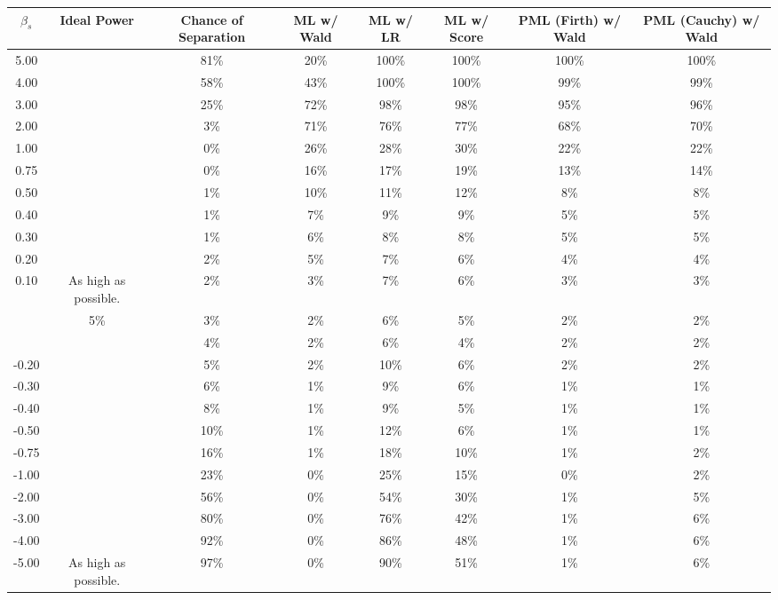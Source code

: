 
\begin{tabular}{>{}cccccccc}
\toprule
$\beta_s$ & Ideal Power & Chance of Separation & ML w/ Wald & ML w/ LR & ML w/ Score & PML (Firth) w/ Wald & PML (Cauchy) w/ Wald\\
\midrule
5.00 &  & 81\% & 20\% & 100\% & 100\% & 100\% & 100\%\\

4.00 &  & 58\% & 43\% & 100\% & 100\% & 99\% & 99\%\\

3.00 &  & 25\% & 72\% & 98\% & 98\% & 95\% & 96\%\\

2.00 &  & 3\% & 71\% & 76\% & 77\% & 68\% & 70\%\\

1.00 &  & 0\% & 26\% & 28\% & 30\% & 22\% & 22\%\\

0.75 &  & 0\% & 16\% & 17\% & 19\% & 13\% & 14\%\\

0.50 &  & 1\% & 10\% & 11\% & 12\% & 8\% & 8\%\\

0.40 &  & 1\% & 7\% & 9\% & 9\% & 5\% & 5\%\\

0.30 &  & 1\% & 6\% & 8\% & 8\% & 5\% & 5\%\\

0.20 &  & 2\% & 5\% & 7\% & 6\% & 4\% & 4\%\\

0.10 & \multirow{-11}{*}{\centering\arraybackslash As high as possible.} & 2\% & 3\% & 7\% & 6\% & 3\% & 3\%\\
\addlinespace
0.00 & 5\% & 3\% & 2\% & 6\% & 5\% & 2\% & 2\%\\
\addlinespace
-0.10 &  & 4\% & 2\% & 6\% & 4\% & 2\% & 2\%\\

-0.20 &  & 5\% & 2\% & 10\% & 6\% & 2\% & 2\%\\

-0.30 &  & 6\% & 1\% & 9\% & 6\% & 1\% & 1\%\\

-0.40 &  & 8\% & 1\% & 9\% & 5\% & 1\% & 1\%\\

-0.50 &  & 10\% & 1\% & 12\% & 6\% & 1\% & 1\%\\

-0.75 &  & 16\% & 1\% & 18\% & 10\% & 1\% & 2\%\\

-1.00 &  & 23\% & 0\% & 25\% & 15\% & 0\% & 2\%\\

-2.00 &  & 56\% & 0\% & 54\% & 30\% & 1\% & 5\%\\

-3.00 &  & 80\% & 0\% & 76\% & 42\% & 1\% & 6\%\\

-4.00 &  & 92\% & 0\% & 86\% & 48\% & 1\% & 6\%\\

-5.00 & \multirow{-11}{*}{\centering\arraybackslash As high as possible.} & 97\% & 0\% & 90\% & 51\% & 1\% & 6\%\\
\bottomrule
\end{tabular}